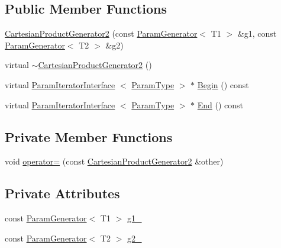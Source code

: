 \subsection*{\-Public \-Member \-Functions}
\begin{DoxyCompactItemize}
\item 
\hyperlink{classtesting_1_1internal_1_1CartesianProductGenerator2_a238628330b67f4cdcd707c3b1aad7229}{\-Cartesian\-Product\-Generator2} (const \hyperlink{classtesting_1_1internal_1_1ParamGenerator}{\-Param\-Generator}$<$ \-T1 $>$ \&g1, const \hyperlink{classtesting_1_1internal_1_1ParamGenerator}{\-Param\-Generator}$<$ \-T2 $>$ \&g2)
\item 
virtual \hyperlink{classtesting_1_1internal_1_1CartesianProductGenerator2_a993e489dc55ace60459472eef3cb701a}{$\sim$\-Cartesian\-Product\-Generator2} ()
\item 
virtual \hyperlink{classtesting_1_1internal_1_1ParamIteratorInterface}{\-Param\-Iterator\-Interface}\*
$<$ \hyperlink{classtesting_1_1internal_1_1CartesianProductGenerator2_aa0cb85aed1e62dc1934db8788770bedc}{\-Param\-Type} $>$ $\ast$ \hyperlink{classtesting_1_1internal_1_1CartesianProductGenerator2_ab6a1e6ee0c9095fec4ca7dd2fe9736cd}{\-Begin} () const 
\item 
virtual \hyperlink{classtesting_1_1internal_1_1ParamIteratorInterface}{\-Param\-Iterator\-Interface}\*
$<$ \hyperlink{classtesting_1_1internal_1_1CartesianProductGenerator2_aa0cb85aed1e62dc1934db8788770bedc}{\-Param\-Type} $>$ $\ast$ \hyperlink{classtesting_1_1internal_1_1CartesianProductGenerator2_a2175654afa23856e885489861c353c72}{\-End} () const 
\end{DoxyCompactItemize}
\subsection*{\-Private \-Member \-Functions}
\begin{DoxyCompactItemize}
\item 
void \hyperlink{classtesting_1_1internal_1_1CartesianProductGenerator2_a88d250648e61e6d398bceac840741572}{operator=} (const \hyperlink{classtesting_1_1internal_1_1CartesianProductGenerator2}{\-Cartesian\-Product\-Generator2} \&other)
\end{DoxyCompactItemize}
\subsection*{\-Private \-Attributes}
\begin{DoxyCompactItemize}
\item 
const \hyperlink{classtesting_1_1internal_1_1ParamGenerator}{\-Param\-Generator}$<$ \-T1 $>$ \hyperlink{classtesting_1_1internal_1_1CartesianProductGenerator2_a315f81360fc67b016cbf514cb78c1975}{g1\-\_\-}
\item 
const \hyperlink{classtesting_1_1internal_1_1ParamGenerator}{\-Param\-Generator}$<$ \-T2 $>$ \hyperlink{classtesting_1_1internal_1_1CartesianProductGenerator2_a4bd40d1fbb8c6d2895b5201e62afbe38}{g2\-\_\-}
\end{DoxyCompactItemize}


